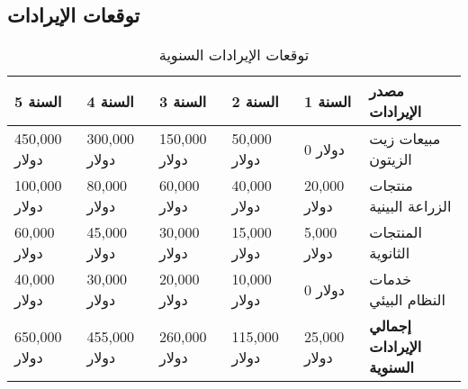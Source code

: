 \subsection{توقعات الإيرادات}

\begin{table}[h]
\centering
\begin{tabular}{p{}p{}p{}p{}p{}p{}}
\hline
\textbf{السنة 5} & \textbf{السنة 4} & \textbf{السنة 3} & \textbf{السنة 2} & \textbf{السنة 1} & \textbf{مصدر الإيرادات} \\
\hline
450,000 دولار & 300,000 دولار & 150,000 دولار & 50,000 دولار & 0 دولار & مبيعات زيت الزيتون \\
100,000 دولار & 80,000 دولار & 60,000 دولار & 40,000 دولار & 20,000 دولار & منتجات الزراعة البينية \\
60,000 دولار & 45,000 دولار & 30,000 دولار & 15,000 دولار & 5,000 دولار & المنتجات الثانوية \\
40,000 دولار & 30,000 دولار & 20,000 دولار & 10,000 دولار & 0 دولار & خدمات النظام البيئي \\
\hline
650,000 دولار & 455,000 دولار & 260,000 دولار & 115,000 دولار & 25,000 دولار & \textbf{إجمالي الإيرادات السنوية} \\
\hline
\end{tabular}
\caption{توقعات الإيرادات السنوية}
\end{table}


